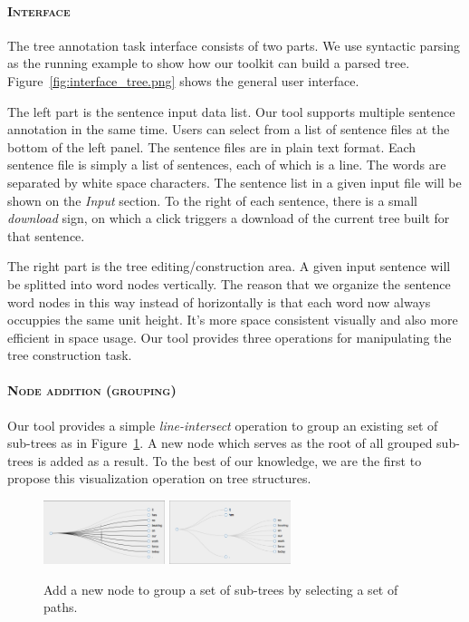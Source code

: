 \paragraph{\textsc{Interface}\\} The tree annotation task interface
consists of two parts.  We use syntactic parsing as the running
example to show how our toolkit can build a parsed tree.
Figure~\ref{fig:interface_tree.png} shows the general user interface. 

The left part is the sentence input data list. Our tool supports
multiple sentence annotation in the same time. Users can select from a
list of sentence files at the bottom of the left panel. The sentence
files are in plain text format. Each sentence file is simply a list of
sentences, each of which is a line. The words are separated by white
space characters. The sentence list in a given input file will be
shown on the \textit{Input} section. To the right of each sentence,
there is a small \textit{download} sign, on which a click triggers a
download of the current tree built for that sentence.


The right part is the tree editing/construction area. A given input
sentence will be splitted into word nodes vertically. The reason that
we organize the sentence word nodes in this way instead of
horizontally is that each word now always occuppies the same unit
height. It's more space consistent visually and also more efficient in
space usage. Our tool provides three operations for manipulating the
tree construction task.


\paragraph{\textsc{Node addition (grouping)}\\}

Our tool provides a simple {\em line-intersect} operation to group an
existing set of sub-trees as in Figure~\ref{fig:new_node.png}. A new
node which serves as the root of all grouped sub-trees is added as a
result. To the best of our knowledge, we are the first to propose this
visualization operation on tree structures. 

\begin{figure}
\centering
\includegraphics[width=1.4in]{figs/new_node_before.png}
\includegraphics[width=1.4in]{figs/new_node_result.png}
\caption{Add a new node to group a set of sub-trees by selecting a set
of paths.}
\label{fig:new_node.png}
\end{figure}


